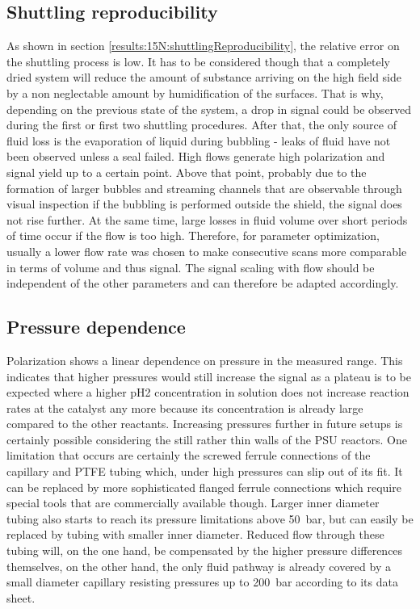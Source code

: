         \subsection{Shuttling reproducibility}
            As shown in section \ref{results:15N:shuttlingReproducibility}, the relative error on the shuttling process is low. It has to be considered though that a completely dried system will reduce the amount of substance arriving on the high field side by a non neglectable amount by humidification of the surfaces. That is why, depending on the previous state of the system, a drop in signal could be observed during the first or first two shuttling procedures. After that, the only source of fluid loss is the evaporation of liquid during bubbling - leaks of fluid have not been observed unless a seal failed. High flows generate high polarization  and signal yield up to a certain point. Above that point, probably due to the formation of larger bubbles and streaming channels that are observable through visual inspection if the bubbling is performed outside the shield, the signal does not rise further. At the same time, large losses in fluid volume over short periods of time occur if the flow is too high. Therefore, for parameter optimization, usually  a lower flow rate was chosen to make consecutive scans more comparable in terms of volume and thus signal. The signal scaling with flow should be independent of the other parameters and can therefore be adapted accordingly.
        \subsection{Pressure dependence}
            Polarization shows a linear dependence on pressure in the measured range. This indicates that higher pressures would still increase the signal as a plateau is to be expected where a higher pH2 concentration in solution does not increase reaction rates at the catalyst any more because its concentration is already large compared to the other reactants. Increasing pressures further in future setups is certainly possible considering the still rather thin walls of the PSU reactors. One limitation that occurs are certainly the screwed ferrule connections of the capillary and PTFE tubing which, under high pressures can slip out of its fit. It can be replaced by more sophisticated flanged ferrule connections which require special tools that are commercially available though. Larger inner diameter tubing also starts to reach its pressure limitations above \SI{50}{\bar}, but can easily be replaced by tubing with smaller inner diameter. Reduced flow through these tubing will, on the one hand, be compensated by the higher pressure differences themselves, on the other hand, the only fluid pathway is already covered by a small diameter capillary resisting pressures up to \SI{200}{\bar} according to its data sheet.

